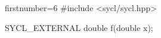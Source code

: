 \begin{ccode*}{firstnumber=6}
#include <sycl/sycl.hpp>

SYCL_EXTERNAL double f(double x);
\end{ccode*}
